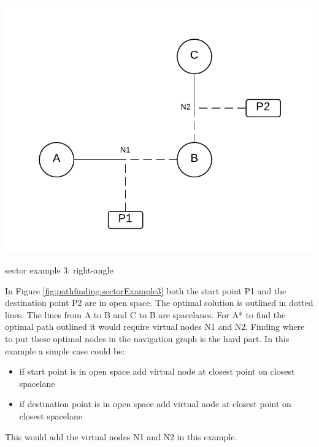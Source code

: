 \begin{marginfigure}
	\includegraphics{res/pathfinding/PathFindingSector3.pdf}
    \caption{sector example 3: right-angle}
	\label{fig:pathfinding:sectorExample3}
\end{marginfigure}
In Figure \ref{fig:pathfinding:sectorExample3} both the start point P1 and the destination point P2 are in open space.
The optimal solution is outlined in dotted lines.
The lines from A to B and C to B are spacelanes.
For A* to find the optimal path outlined it would require virtual nodes N1 and N2.
Finding where to put these optimal nodes in the navigation graph is the hard part.
In this example a simple case could be:
\begin{itemize}
\item if start point is in open space add virtual node at closest point on closest spacelane
\item if destination point is in open space add virtual node at closest point on closest spacelane
\end{itemize}
This would add the virtual nodes N1 and N2 in this example.

